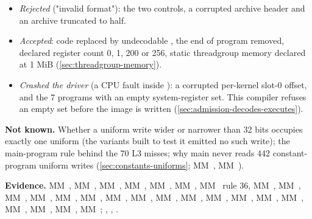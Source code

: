 \begin{itemize}
\item \emph{Rejected} ("invalid format"): the two controls, a corrupted archive header and an archive truncated to half.
\item \emph{Accepted}: code replaced by undecodable , the end of program removed, declared register count 0, 1, 200 or 256,
  static threadgroup memory declared at 1 MiB (\cref{sec:threadgroup-memory}).
\item \emph{Crashed the driver} (a CPU fault inside ): a corrupted per-kernel slot-0 offset, and the 7
  programs with an empty system-register set. This compiler refuses an empty set before the image is written
  (\cref{sec:admission-decodes-executes}).
\end{itemize}

\textbf{Not known.} Whether a uniform write wider or narrower than 32 bits occupies exactly one uniform (the variants built to
test it emitted no such write); the main-program rule behind the 70 L3 misses; why main never reads 442 constant-program
uniform writes (\cref{sec:constants-uniforms}; MM~, MM~).

\textbf{Evidence.} MM~, MM~, MM~, MM~, MM~, MM~, MM~ rule 36, MM~, MM~,
MM~, MM~, MM~, MM~, MM~, MM~, MM~, MM~,
MM~, MM~, MM~, MM~, MM~, MM~, MM~, MM~; ,
, .
